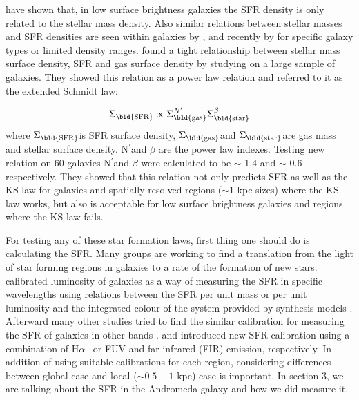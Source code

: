 \documentclass[useAMS,usenatbib]{mn2e}
\newcommand \sigmagas    {$\Sigma_{\rm \bld {gas }}$}
\newcommand \eqsigmagas    {\Sigma_{\rm \bld {gas }}}
\newcommand \sigmasfr     {$\Sigma_{\rm \bld {SFR }}$}
\newcommand \eqsigmasfr     {\Sigma_{\rm \bld {SFR }}}
\newcommand \sigmastar    {$\Sigma_{\rm \bld {star }}$}
\newcommand \eqsigmastar    {\Sigma_{\rm \bld {star }}}
\newcommand \halpha    {H$\alpha$ \ }
\newcommand \nprime {N$^\prime$}
\newcommand \eqnprime {N^\prime}
\begin{document}
\cite{Hunter98} have shown that, in low surface brightness galaxies the SFR density is only related to the stellar mass density. Also similar relations between stellar masses and SFR densities are seen within galaxies by \cite{Ryder94}, \cite{Hunter04} and recently by \cite{Leroy08} for specific galaxy types or limited density ranges. \cite{Shi11} found a tight relationship between stellar mass surface density, SFR and gas surface density by studying on a large sample of galaxies. They showed this relation as a power law relation and referred to it as the extended Schmidt law: 

\begin{equation}
\eqsigmasfr \propto \eqsigmagas^{\eqnprime} \eqsigmastar^{\beta}
\end{equation}
where \sigmasfr is SFR surface density, \sigmagas and \sigmastar are gas mass and stellar surface density. \nprime and $\beta$ are the power law indexes. Testing new relation on 60 galaxies \nprime and $\beta$ were calculated to be $\sim$ 1.4 and $\sim$ 0.6 respectively. They showed that this relation not only predicts SFR as well as the KS law for galaxies and spatially resolved regions ($\sim$1 kpc sizes) where the KS law works, but also is acceptable for low surface brightness galaxies and regions where the KS law fails.

For testing any of these star formation laws, first thing one should do is calculating the SFR. Many groups are working to find a translation from the light of star forming regions in galaxies to a rate of the formation of new stars. \cite{Kennicutt98b} calibrated luminosity of galaxies as a way of measuring the SFR in specific wavelengths using relations between the SFR per unit mass or per unit luminosity and the integrated colour of the system provided by synthesis models  \citep[e.g.,][]{Bruzual93}. Afterward many other studies tried to find the similar calibration for measuring the SFR of galaxies in other bands \citep[e.g.,][]{Kennicutt12, Calzetti12, Zhu08, Kennicutt09, Boquien10, Boquien11, Hao11}. \cite{Kennicutt09} and \cite{Hao11} introduced new SFR calibration using a combination of \halpha or FUV and far infrared (FIR) emission, respectively. In addition of using suitable calibrations for each region, considering differences between global case and local ($\sim 0.5-1$ kpc) case is important. In section 3, we are talking about the SFR in the Andromeda galaxy and how we did measure it. 
\end{document}

